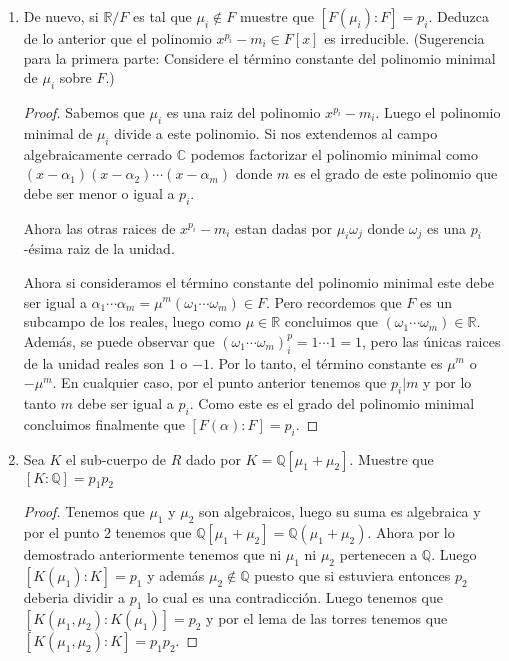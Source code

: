 \documentclass[letter,twoside,12pt]{article}
\begin{document}
\begin{enumerate}
\begin{enumerate}
\begin{proof}
Entonces si suponemos por contradicción que existe $ n $ tal que $ p_i  \not|\; n $ y $ \mu_i^n \in F $ tendriamos primero que $ g.c.d(n,p_i)=1 $ y por lo discutido anteriormente concluimos que $ \alpha^1=\alpha \in F $ lo cual es una contradicción. 
\end{proof}
\item De nuevo, si $ \mathbb{R}/F $ es tal que $ \mu_i \not \in F $ muestre que $ [F(\mu_i) : F] = p_i $. Deduzca de lo anterior que el
polinomio $ x^{p_i} - m_i \in F[x] $ es irreducible. (Sugerencia para la primera parte: Considere el término
constante del polinomio minimal de $ \mu_i $ sobre $ F $.)

\begin{proof}
Sabemos que $ \mu_i $ es una raiz del polinomio $ x^{p_i}-m_i $. Luego el polinomio minimal de $ \mu_i $ divide a este polinomio. Si nos extendemos al campo algebraicamente cerrado $ \mathbb{C} $ podemos factorizar el polinomio minimal como $ (x-\alpha_1)(x-\alpha_2)\cdots (x-\alpha_m) $ donde $ m $ es el grado de este polinomio que debe ser menor o igual a $ p_i $.

Ahora las otras raices de $ x^{p_i}-m_i $ estan dadas por $ \mu_i \omega_j $ donde $ \omega_j $ es una $ p_i $-ésima raiz de la unidad.

Ahora si consideramos el término constante del polinomio minimal este debe ser igual a $ \alpha_1\cdots \alpha_m = \mu^m(\omega_1\cdots \omega_m) \in F $. Pero recordemos que $ F $ es un subcampo de los reales, luego como $ \mu \in \mathbb{R} $ concluimos que $ (\omega_1\cdots \omega_m) \in \mathbb{R}$. Además, se puede observar que $ (\omega_1\cdots \omega_m)^p_i = 1\cdots 1 = 1 $, pero las únicas raices de la unidad reales son $ 1 $ o $ -1 $. Por lo tanto, el término constante es $ \mu^m $ o $ -\mu^m $. En cualquier caso, por el punto anterior tenemos que $ p_i|m $ y por lo tanto $ m $ debe ser igual a $ p_i $. Como este es el grado del polinomio minimal concluimos finalmente que $ [F(\alpha):F]=p_i $. 
\end{proof}
\item  Sea $ K $ el sub-cuerpo de $ R $ dado por $ K = \mathbb{Q}[\mu_1 + \mu_2] $. Muestre que $ [K : \mathbb{Q}] = p_1p_2 $
\begin{proof}
Tenemos que $ \mu_1 $ y $ \mu_2 $ son algebraicos, luego su suma es algebraica y por el punto 2 tenemos que $ \mathbb{Q}[\mu_1 + \mu_2] = \mathbb{Q}(\mu_1 + \mu_2) $. Ahora por lo demostrado anteriormente tenemos que ni $ \mu_1 $ ni $ \mu_2 $ pertenecen a $ \mathbb{Q} $. Luego $ [K(\mu_1):K]=p_1 $ y además $ \mu_2 \not \in \mathbb{Q} $ puesto que si estuviera entonces $ p_2 $ deberia dividir a $ p_1 $ lo cual es una contradicción. Luego tenemos que $ [K(\mu_1,\mu_2):K(\mu_1)]=p_2 $ y por el lema de las torres tenemos que $ [K(\mu_1,\mu_2):K]=p_1p_2 $.


\end{proof}
\end{enumerate}
\end{enumerate}
\end{document}
